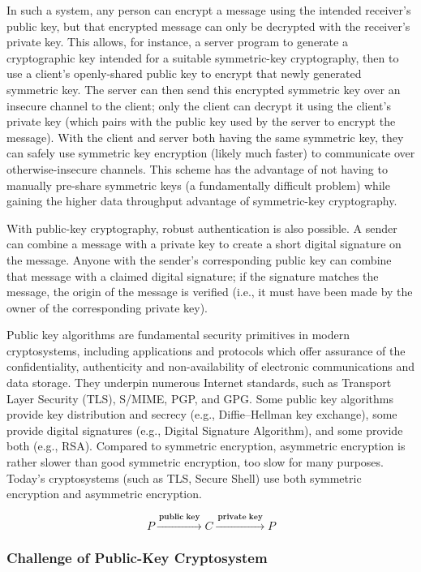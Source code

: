 \documentclass[british]{article}
\begin{document}
In such a system, any person can encrypt a message using the intended
receiver's public key, but that encrypted message can only be decrypted
with the receiver's private key. This allows, for instance, a server
program to generate a cryptographic key intended for a suitable symmetric-key
cryptography, then to use a client's openly-shared public key to encrypt
that newly generated symmetric key. The server can then send this
encrypted symmetric key over an insecure channel to the client; only
the client can decrypt it using the client's private key (which pairs
with the public key used by the server to encrypt the message). With
the client and server both having the same symmetric key, they can
safely use symmetric key encryption (likely much faster) to communicate
over otherwise-insecure channels. This scheme has the advantage of
not having to manually pre-share symmetric keys (a fundamentally difficult
problem) while gaining the higher data throughput advantage of symmetric-key
cryptography.

With public-key cryptography, robust authentication is also possible.
A sender can combine a message with a private key to create a short
digital signature on the message. Anyone with the sender's corresponding
public key can combine that message with a claimed digital signature;
if the signature matches the message, the origin of the message is
verified (i.e., it must have been made by the owner of the corresponding
private key).

Public key algorithms are fundamental security primitives in modern
cryptosystems, including applications and protocols which offer assurance
of the confidentiality, authenticity and non-availability of electronic
communications and data storage. They underpin numerous Internet standards,
such as Transport Layer Security (TLS), S/MIME, PGP, and GPG. Some
public key algorithms provide key distribution and secrecy (e.g.,
Diffie--Hellman key exchange), some provide digital signatures (e.g.,
Digital Signature Algorithm), and some provide both (e.g., RSA). Compared
to symmetric encryption, asymmetric encryption is rather slower than
good symmetric encryption, too slow for many purposes. Today's cryptosystems
(such as TLS, Secure Shell) use both symmetric encryption and asymmetric
encryption.

\[
	P\xrightarrow{\:\textbf{public key}\:}C\xrightarrow{\:\textbf{private key}\:}P
\]

\medskip{}


\subsubsection{Challenge of Public-Key Cryptosystem}
\end{document}
